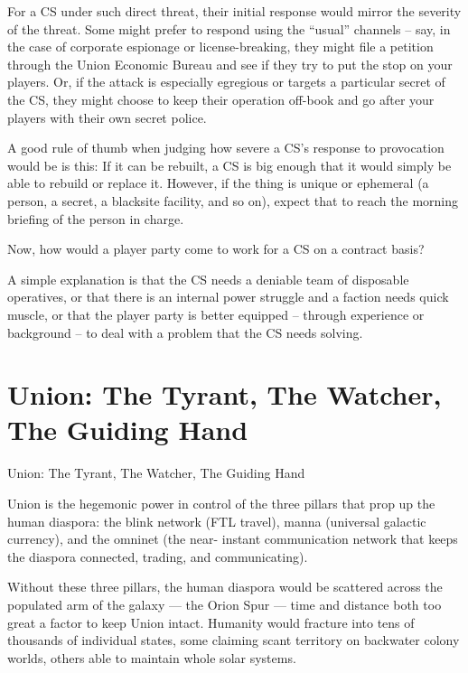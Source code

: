 For a CS under such direct threat, their initial response would mirror the severity of the threat.  
Some might prefer to respond using the “usual” channels -- say, in the case of corporate  
espionage or license-breaking, they might file a petition through the Union Economic Bureau and  
see if they try to put the stop on your players. Or, if the attack is especially egregious or targets a  
particular secret of the CS, they might choose to keep their operation off-book and go after your  
players with their own secret police.   

A good rule of thumb when judging how severe a CS’s response to provocation would be is this: If  
it can be rebuilt, a CS is big enough that it would simply be able to rebuild or replace it. However,  
if the thing is unique or ephemeral (a person, a secret, a blacksite facility, and so on), expect that  
to reach the morning briefing of the person in charge.   

Now, how would a player party come to work for a CS on a contract basis?   

A simple explanation is that the CS needs a deniable team of disposable operatives, or that there  
is an internal power struggle and a faction needs quick muscle, or that the player party is better  
equipped -- through experience or background -- to deal with a problem that the CS needs  
solving.   

                                                                                                               


\section{Union: The Tyrant, The Watcher, The Guiding Hand}

Union: The Tyrant, The Watcher, The  
Guiding Hand   

Union is the hegemonic power in control of the three pillars that prop up the human diaspora:  
the blink network (FTL travel), manna (universal galactic currency), and the omninet (the near- 
instant communication network that keeps the diaspora connected, trading, and  
communicating). 
 

Without these three pillars, the human diaspora would be scattered across the populated arm of  
the galaxy — the Orion Spur — time and distance both too great a factor to keep Union intact.  
Humanity would fracture into tens of thousands of individual states, some claiming scant territory  
on backwater colony worlds, others able to maintain whole solar systems.
 

